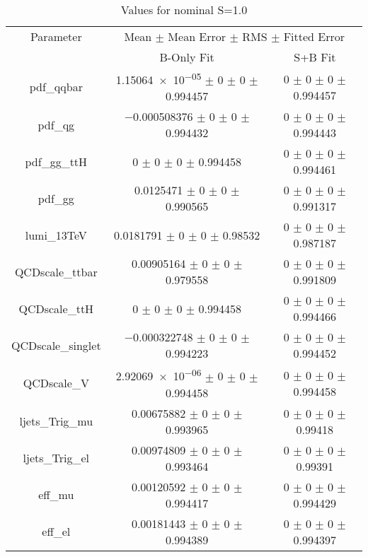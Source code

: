 \begin{table}
\centering
\caption{Values for nominal S=1.0}
\begin{tabular}{ccc}
\toprule
Parameter 	& \multicolumn{2}{c}{Mean $\pm$ Mean Error $\pm$ RMS $\pm$ Fitted Error}\\
 	& B-Only Fit & S+B Fit\\
\midrule
pdf\_qqbar 	& \num{1.15064e-05} $\pm$ \num{0} $\pm$ \num{0} $\pm$ \num{0.994457} 	& \num{0} $\pm$ \num{0} $\pm$ \num{0} $\pm$ \num{0.994457}\\
pdf\_qg 	& \num{-0.000508376} $\pm$ \num{0} $\pm$ \num{0} $\pm$ \num{0.994432} 	& \num{0} $\pm$ \num{0} $\pm$ \num{0} $\pm$ \num{0.994443}\\
pdf\_gg\_ttH 	& \num{0} $\pm$ \num{0} $\pm$ \num{0} $\pm$ \num{0.994458} 	& \num{0} $\pm$ \num{0} $\pm$ \num{0} $\pm$ \num{0.994461}\\
pdf\_gg 	& \num{0.0125471} $\pm$ \num{0} $\pm$ \num{0} $\pm$ \num{0.990565} 	& \num{0} $\pm$ \num{0} $\pm$ \num{0} $\pm$ \num{0.991317}\\
lumi\_13TeV 	& \num{0.0181791} $\pm$ \num{0} $\pm$ \num{0} $\pm$ \num{0.98532} 	& \num{0} $\pm$ \num{0} $\pm$ \num{0} $\pm$ \num{0.987187}\\
QCDscale\_ttbar 	& \num{0.00905164} $\pm$ \num{0} $\pm$ \num{0} $\pm$ \num{0.979558} 	& \num{0} $\pm$ \num{0} $\pm$ \num{0} $\pm$ \num{0.991809}\\
QCDscale\_ttH 	& \num{0} $\pm$ \num{0} $\pm$ \num{0} $\pm$ \num{0.994458} 	& \num{0} $\pm$ \num{0} $\pm$ \num{0} $\pm$ \num{0.994466}\\
QCDscale\_singlet 	& \num{-0.000322748} $\pm$ \num{0} $\pm$ \num{0} $\pm$ \num{0.994223} 	& \num{0} $\pm$ \num{0} $\pm$ \num{0} $\pm$ \num{0.994452}\\
QCDscale\_V 	& \num{2.92069e-06} $\pm$ \num{0} $\pm$ \num{0} $\pm$ \num{0.994458} 	& \num{0} $\pm$ \num{0} $\pm$ \num{0} $\pm$ \num{0.994458}\\
ljets\_Trig\_mu 	& \num{0.00675882} $\pm$ \num{0} $\pm$ \num{0} $\pm$ \num{0.993965} 	& \num{0} $\pm$ \num{0} $\pm$ \num{0} $\pm$ \num{0.99418}\\
ljets\_Trig\_el 	& \num{0.00974809} $\pm$ \num{0} $\pm$ \num{0} $\pm$ \num{0.993464} 	& \num{0} $\pm$ \num{0} $\pm$ \num{0} $\pm$ \num{0.99391}\\
eff\_mu 	& \num{0.00120592} $\pm$ \num{0} $\pm$ \num{0} $\pm$ \num{0.994417} 	& \num{0} $\pm$ \num{0} $\pm$ \num{0} $\pm$ \num{0.994429}\\
eff\_el 	& \num{0.00181443} $\pm$ \num{0} $\pm$ \num{0} $\pm$ \num{0.994389} 	& \num{0} $\pm$ \num{0} $\pm$ \num{0} $\pm$ \num{0.994397}\\

\end{tabular}
\end{table}
